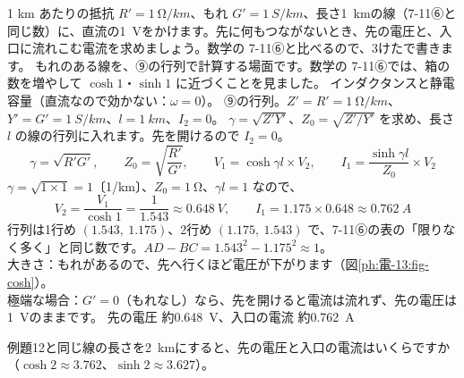 \label{ph:電-13:ex12}
\begin{phreidai}[もれのある長い線（7-11 の線）]
1 km あたりの抵抗 $R'=\qty{1}{\ohm/km}$、もれ $G'=\qty{1}{S/km}$、長さ\qty{1}{km}の線（7-11⑥と同じ数）に、直流の\qty{1}{V}をかけます。先に何もつながないとき、先の電圧と、入口に流れこむ電流を求めましょう。数学の 7-11⑥と比べるので、3けたで書きます。
\phbamen
もれのある線を、⑨の行列で計算する場面です。数学の 7-11⑥では、箱の数を増やして $\cosh1$・$\sinh1$ に近づくことを見ました。
\phmushi
インダクタンスと静電容量（直流なので効かない：$\omega=0$）。
\phzu
⑨の行列。$Z'=R'=\qty{1}{\ohm/km}$、$Y'=G'=\qty{1}{S/km}$、$l=\qty{1}{km}$、$I_2=0$。
\phriyu
$\gamma=\sqrt{Z'Y'}$、$Z_0=\sqrt{Z'/Y'}$ を求め、長さ $l$ の線の行列に入れます。先を開けるので $I_2=0$。
\phtateru
\[\gamma=\sqrt{R'G'},\qquad Z_0=\sqrt{\frac{R'}{G'}},\qquad V_1=\cosh\gamma l\times V_2,\qquad I_1=\frac{\sinh\gamma l}{Z_0}\times V_2\]
\phtoku
$\gamma=\sqrt{1\times1}=1$〔1/km〕、$Z_0=\qty{1}{\ohm}$、$\gamma l=1$ なので、
\[V_2=\frac{V_1}{\cosh1}=\frac{1}{1.543}\approx\qty{0.648}{V},\qquad I_1=1.175\times0.648\approx\qty{0.762}{A}\]
\phtashikame
行列は1行め $(1.543,\ 1.175)$、2行め $(1.175,\ 1.543)$ で、7-11⑥の表の「限りなく多く」と同じ数です。$AD-BC=1.543^2-1.175^2\approx1$。\\
大きさ：もれがあるので、先へ行くほど電圧が下がります（図\ref{ph:電-13:fig-cosh}）。\\
極端な場合：$G'=0$（もれなし）なら、先を開けると電流は流れず、先の電圧は\qty{1}{V}のままです。
\kotae 先の電圧 約\qty{0.648}{V}、入口の電流 約\qty{0.762}{A}
\end{phreidai}
\begin{jibun}
例題12と同じ線の長さを\qty{2}{km}にすると、先の電圧と入口の電流はいくらですか（$\cosh2\approx3.762$、$\sinh2\approx3.627$）。
\end{jibun}

\begin{bkfigure}
\label{ph:電-13:fig-cosh}
\end{bkfigure}

